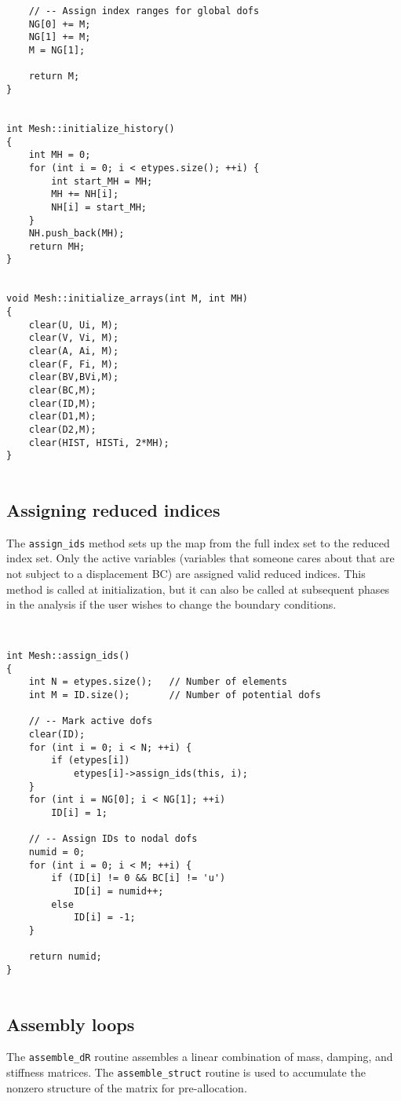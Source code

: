 \begin{verbatim}
    // -- Assign index ranges for global dofs
    NG[0] += M;
    NG[1] += M;
    M = NG[1];

    return M;
}


int Mesh::initialize_history()
{
    int MH = 0;
    for (int i = 0; i < etypes.size(); ++i) {
        int start_MH = MH;
        MH += NH[i];
        NH[i] = start_MH;
    }
    NH.push_back(MH);
    return MH;
}


void Mesh::initialize_arrays(int M, int MH)
{
    clear(U, Ui, M);
    clear(V, Vi, M);
    clear(A, Ai, M);
    clear(F, Fi, M);
    clear(BV,BVi,M);
    clear(BC,M);
    clear(ID,M);
    clear(D1,M);
    clear(D2,M);
    clear(HIST, HISTi, 2*MH);
}


\end{verbatim}
\subsection{Assigning reduced indices}

The {\tt assign\_ids} method sets up the map from the full index
set to the reduced index set.  Only the active variables (variables
that someone cares about that are not subject to a displacement BC)
are assigned valid reduced indices.  This method is called at
initialization, but it can also be called at subsequent phases in
the analysis if the user wishes to change the boundary conditions.

\begin{verbatim}


int Mesh::assign_ids()
{
    int N = etypes.size();   // Number of elements
    int M = ID.size();       // Number of potential dofs

    // -- Mark active dofs
    clear(ID);
    for (int i = 0; i < N; ++i) {
        if (etypes[i])
            etypes[i]->assign_ids(this, i);
    }
    for (int i = NG[0]; i < NG[1]; ++i)
        ID[i] = 1;

    // -- Assign IDs to nodal dofs
    numid = 0;
    for (int i = 0; i < M; ++i) {
        if (ID[i] != 0 && BC[i] != 'u')
            ID[i] = numid++;
        else
            ID[i] = -1;
    }

    return numid;
}


\end{verbatim}
\subsection{Assembly loops}

The {\tt assemble\_dR} routine assembles a linear combination of
mass, damping, and stiffness matrices.  The {\tt assemble\_struct}
routine is used to accumulate the nonzero structure of the matrix
for pre-allocation. 

